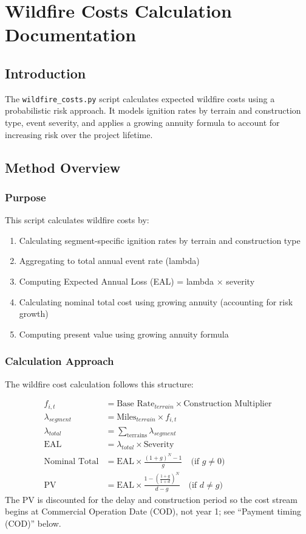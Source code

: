 \documentclass[ctcc_full_documentation.tex]{subfiles}
\begin{document}
\chapter{Wildfire Costs Calculation Documentation}

\section{Introduction}

The \texttt{wildfire\_costs.py} script calculates expected wildfire costs using a probabilistic risk approach. It models ignition rates by terrain and construction type, event severity, and applies a growing annuity formula to account for increasing risk over the project lifetime.

\section{Method Overview}

\subsection{Purpose}

This script calculates wildfire costs by:
\begin{enumerate}
    \item Calculating segment-specific ignition rates by terrain and construction type
    \item Aggregating to total annual event rate (lambda)
    \item Computing Expected Annual Loss (EAL) = lambda × severity
    \item Calculating nominal total cost using growing annuity (accounting for risk growth)
    \item Computing present value using growing annuity formula
\end{enumerate}

\subsection{Calculation Approach}

The wildfire cost calculation follows this structure:

\begin{align}
f_{i,t} &= \text{Base Rate}_{terrain} \times \text{Construction Multiplier} \\
\lambda_{segment} &= \text{Miles}_{terrain} \times f_{i,t} \\
\lambda_{total} &= \sum_{\text{terrains}} \lambda_{segment} \\
\text{EAL} &= \lambda_{total} \times \text{Severity} \\
\text{Nominal Total} &= \text{EAL} \times \frac{(1+g)^N - 1}{g} \quad \text{(if } g \neq 0 \text{)} \\
\text{PV} &= \text{EAL} \times \frac{1 - \left(\frac{1+g}{1+d}\right)^N}{d - g} \quad \text{(if } d \neq g \text{)}
\end{align}
The PV is discounted for the delay and construction period so the cost stream begins at Commercial Operation Date (COD), not year 1; see ``Payment timing (COD)'' below.
\end{document}
